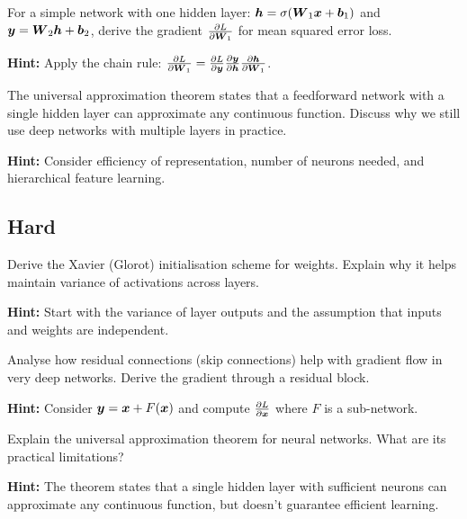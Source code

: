 \begin{problem}
For a simple network with one hidden layer: $\boldsymbol{h} = \sigma(\boldsymbol{W}_1\boldsymbol{x} + \boldsymbol{b}_1)$ and $\boldsymbol{y} = \boldsymbol{W}_2\boldsymbol{h} + \boldsymbol{b}_2$, derive the gradient $\frac{\partial L}{\partial \boldsymbol{W}_1}$ for mean squared error loss.

\textbf{Hint:} Apply the chain rule: $\frac{\partial L}{\partial \boldsymbol{W}_1} = \frac{\partial L}{\partial \boldsymbol{y}} \frac{\partial \boldsymbol{y}}{\partial \boldsymbol{h}} \frac{\partial \boldsymbol{h}}{\partial \boldsymbol{W}_1}$.
\end{problem}

\begin{problem}
The universal approximation theorem states that a feedforward network with a single hidden layer can approximate any continuous function. Discuss why we still use deep networks with multiple layers in practice.

\textbf{Hint:} Consider efficiency of representation, number of neurons needed, and hierarchical feature learning.
\end{problem}

\subsection*{Hard}

\begin{problem}
Derive the Xavier (Glorot) initialisation scheme for weights. Explain why it helps maintain variance of activations across layers.

\textbf{Hint:} Start with the variance of layer outputs and the assumption that inputs and weights are independent.
\end{problem}

\begin{problem}
Analyse how residual connections (skip connections) help with gradient flow in very deep networks. Derive the gradient through a residual block.

\textbf{Hint:} Consider $\boldsymbol{y} = \boldsymbol{x} + F(\boldsymbol{x})$ and compute $\frac{\partial L}{\partial \boldsymbol{x}}$ where $F$ is a sub-network.
\end{problem}

\begin{problem}
Explain the universal approximation theorem for neural networks. What are its practical limitations?

\textbf{Hint:} The theorem states that a single hidden layer with sufficient neurons can approximate any continuous function, but doesn't guarantee efficient learning.
\end{problem}

